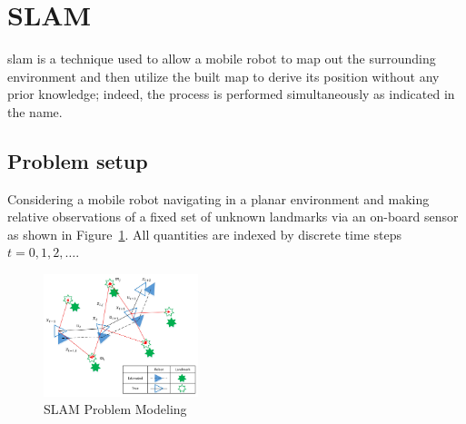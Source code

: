 \section{SLAM}\label{slam}

\gls{slam} is a technique used to allow a mobile robot to map out the surrounding environment and then utilize the built map to derive its position without any prior knowledge; indeed, the process is performed simultaneously as indicated in the name.

\subsection{Problem setup}

Considering a mobile robot navigating in a planar environment and making relative observations of a fixed set of unknown landmarks via an on-board sensor as shown in Figure~\ref{fig:SLAM-modeling}. All quantities are indexed by discrete time steps \(t=0,1,2,\dots\).

\begin{figure}[H]
  \centering
  \includegraphics[width=0.4\textwidth]{imgs/SLAM_problrm_modeling.png}
  \caption{SLAM Problem Modeling~\cite{electronics9040695}}
  \label{fig:SLAM-modeling}
\end{figure}

